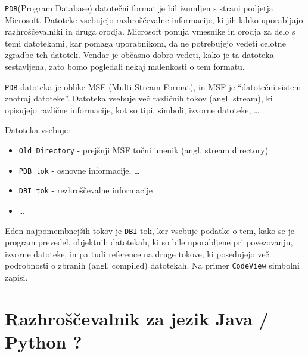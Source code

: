 \documentclass[a4paper,notitlepage]{article}
\newcommand{\code}[1]{\texttt{#1}}
\begin{document}
\code{PDB}\cite{llvm-pdb}(Program Database) datotečni format je bil izumljen s strani podjetja Microsoft. Datoteke vsebujejo razhroščevalne informacije, ki jih lahko uporabljajo razhroščevalniki in druga orodja.
Microsoft ponuja vmesnike in orodja za delo s temi datotekami, kar pomaga uporabnikom, da ne potrebujejo vedeti celotne zgradbe teh datotek.
Vendar je občasno dobro vedeti, kako je ta datoteka sestavljena, zato bomo pogledali nekaj malenkosti o tem formatu.

\code{PDB} datoteka je oblike MSF (Multi-Stream Format), in MSF je ``datotečni sistem znotraj datoteke''. Datoteka vsebuje več različnih tokov (angl. stream), ki opisujejo različne informacije, kot so tipi, simboli, izvorne datoteke, \ldots

Datoteka vsebuje:
\begin{itemize}
    \item \code{Old Directory} -  prejšnji MSF točni imenik (angl. stream directory)
    \item \code{PDB tok} - osnovne informacije, \ldots
    \item \code{DBI tok} - rezhroščevalne informacije
    \item \ldots
\end{itemize}

Eden najpomembnejših tokov je \href{https://llvm.org/docs/PDB/DbiStream.html}{\code{DBI}} tok, ker vsebuje podatke o tem, kako se je program prevedel, objektnih datotekah, ki so bile uporabljene pri povezovanju, izvorne datoteke, in pa tudi reference na druge tokove, ki posedujejo več podrobnosti o zbranih (angl. compiled) datotekah. Na primer \code{CodeView} simbolni zapisi.

\section{Razhroščevalnik za jezik Java / Python ?}

\nocite{*} %


\end{document}
